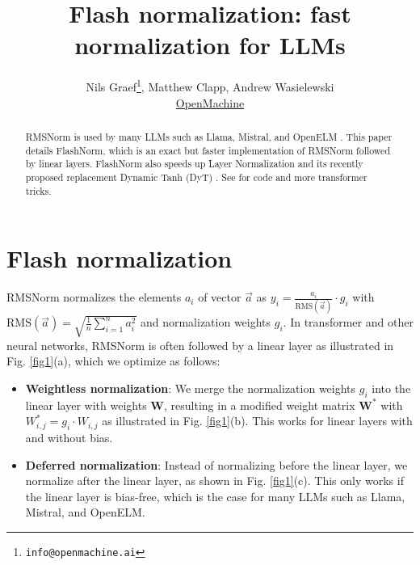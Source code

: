 \documentclass{article}
\title{Flash normalization: fast normalization for LLMs}
\author{Nils Graef\thanks{\texttt{info@openmachine.ai}}, Matthew Clapp, Andrew Wasielewski \\
  \href{https://openmachine.ai}{OpenMachine}}
\numberwithin{equation}{section} %
\newcommand{\mat}[1]{\mathbf{#1}}     %
\def\rms{\text{RMS}(\vec{a})}         %
\def\f1n{\frac{1}{n}}                 %
\def\sas{\sum_{i=1}^n a_i^2}          %
\def\W*{\mat{W}^\ast}                 %
\def\a{\vec{a}}                       %
\begin{document}
 \maketitle

\begin{abstract}
RMSNorm \citep{rms} is used by many LLMs such as Llama, Mistral, and OpenELM \citep{LLaMA, mistral, openelm}.
This paper details FlashNorm, which is an exact but faster implementation of RMSNorm followed by linear layers. FlashNorm also speeds up Layer Normalization \citep{layerNorm} and its recently proposed replacement Dynamic Tanh (DyT) \citep{DyT}. See \citep{slimAttn, tricks, remove, precompute} for code and more transformer tricks.
\end{abstract}

\section{Flash normalization}
RMSNorm \citep{rms} normalizes the elements  $a_i$ of vector $\a$ as $y_i = \frac{a_i}{\rms} \cdot g_i$ with $\rms = \sqrt{\f1n \sas}$ and normalization weights $g_i$. In transformer \citep{vanilla} and other neural networks, RMSNorm is often followed by a linear layer as illustrated in Fig. \ref{fig1}(a), which we optimize as follows:
\begin{itemize}[topsep=-1pt, itemsep=-1pt]
  \item \textbf{Weightless normalization}: We merge the normalization weights $g_i$ into the linear layer with weights $\mat{W}$, resulting in a modified weight matrix $\W*$ with $W_{i,j}^\ast = g_i \cdot W_{i,j}$ as illustrated in Fig. \ref{fig1}(b). This works for linear layers with and without bias.
  \item \textbf{Deferred normalization}: Instead of normalizing before the linear layer, we normalize after the linear layer, as shown in Fig. \ref{fig1}(c). This only works if the linear layer is bias-free, which is the case for many LLMs such as Llama, Mistral, and OpenELM.
\end{itemize}
\end{document}
